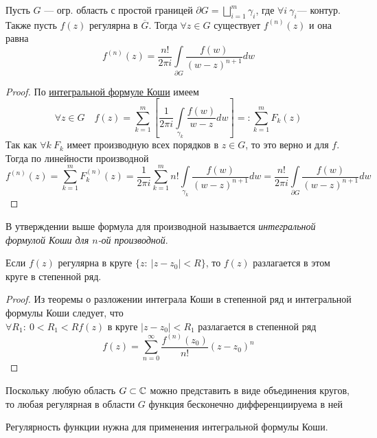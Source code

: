 \begin{theorem}
Пусть $G$ --- огр. область с простой границей \(\partial G = \bigsqcup\limits_{i=1}^m \gamma_i\), где \(\forall i\: \gamma_i \text{--- контур}\). Также пусть \(f(z)\) регулярна в \(\overline{G}\). Тогда \(\forall z \in G\) существует \(f^{(n)}(z)\) и она равна
\[f^{(n)}(z) = \frac{n!}{2 \pi i} \int\limits_{\partial G} \frac{f(w)}{(w-z)^{n+1}}dw\]
\end{theorem}

\begin{proof}
По \hyperref[cauchy-integral-formula]{интегральной формуле Коши} имеем
\[\forall z \in G \quad f(z) = \sum\limits_{k=1}^m \left[\frac{1}{2 \pi i} \int\limits_{\gamma_k} \frac{f(w)}{w-z}dw \right] =: \sum\limits_{k=1}^m F_k(z)\]
Так как \(\forall k\: F_k\) имеет производную всех порядков в \(z \in G\), то это верно и для $f$. Тогда по линейности производной
\[f^{(n)}(z) = \sum\limits_{k=1}^m F_k^{(n)}(z) = \frac{1}{2 \pi i} \sum\limits_{k=1}^m n! \int\limits_{\gamma_k} \frac{f(w)}{(w-z)^{n+1}}dw = \frac{n!}{2 \pi i} \int\limits_{\partial G} \frac{f(w)}{(w-z)^{n+1}}dw\]
\end{proof}

\begin{definition}
    В утверждении выше формула для производной называется \textit{интегральной формулой Коши для $n$-ой производной}.
\end{definition}

\begin{corollary}
Если $f(z)$ регулярна в круге \(\{z:\: |z-z_0| < R\}\), то \(f(z)\) разлагается в этом круге в степенной ряд.
\end{corollary}
\begin{proof}
Из теоремы о разложении интеграла Коши в степенной ряд и интегральной формулы Коши следует, что \(\forall R_1:\: 0 < R_1 < R f(z) \text{ в круге }|z-z_0| < R_1 \text{ разлагается в степенной ряд}\)
\[f(z) = \sum\limits_{n=0}^\infty \frac{f^{(n)}(z_0)}{n!}(z-z_0)^n\]
\end{proof}

\begin{note}
\label{infinity-diff-reg}
	Поскольку любую область $G \subset \mathbb{C}$ можно представить в виде объединения кругов, то любая регулярная в области $G$ функция бесконечно дифференциируема в ней
\end{note}

\begin{note}
	Регулярность функции нужна для применения интегральной формулы Коши.
\end{note}